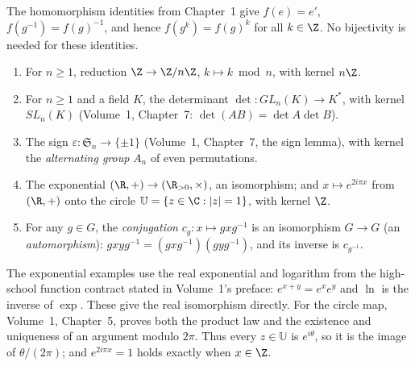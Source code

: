 The homomorphism identities from Chapter~1 give $f(e)=e'$, $f(g^{-1})=f(g)^{-1}$, and hence $f(g^k)=f(g)^k$ for all $k\in\Z$. No bijectivity is needed for these identities.

\begin{example}\label{ex:homs}
\begin{enumerate}[label=(\arabic*)]
\item For $n\ge1$, reduction $\Z\to\Z/n\Z$, $k\mapsto k\bmod n$, with kernel $n\Z$.
\item For $n\ge1$ and a field $K$, the determinant $\det:GL_n(K)\to K^*$, with kernel $SL_n(K)$ (Volume~1, Chapter~7: $\det(AB)=\det A\det B$).
\item The sign $\varepsilon:\mathfrak S_n\to\{\pm1\}$ (Volume~1, Chapter~7, the sign lemma), with kernel the \emph{alternating group} $A_n$ of even permutations.
\item The exponential $(\R,+)\to(\R_{>0},\times)$, an isomorphism; and $x\mapsto e^{2i\pi x}$ from $(\R,+)$ onto the circle $\mathbb U=\{z\in\C:|z|=1\}$, with kernel $\Z$.
\item For any $g\in G$, the \emph{conjugation} $c_g:x\mapsto gxg^{-1}$ is an isomorphism $G\to G$ (an \emph{automorphism}): $gxyg^{-1}=(gxg^{-1})(gyg^{-1})$, and its inverse is $c_{g^{-1}}$.
\end{enumerate}
\end{example}

The exponential examples use the real exponential and logarithm from the
high-school function contract stated in Volume~1's preface: $e^{x+y}=e^xe^y$
and $\ln$ is the inverse of $\exp$. These give the real isomorphism directly.
For the circle map, Volume~1, Chapter~5, proves both the product law and
the existence and uniqueness of an argument modulo $2\pi$. Thus every
$z\in\mathbb U$ is $e^{i\theta}$, so it is the image of $\theta/(2\pi)$;
and $e^{2i\pi x}=1$ holds exactly when $x\in\Z$.

